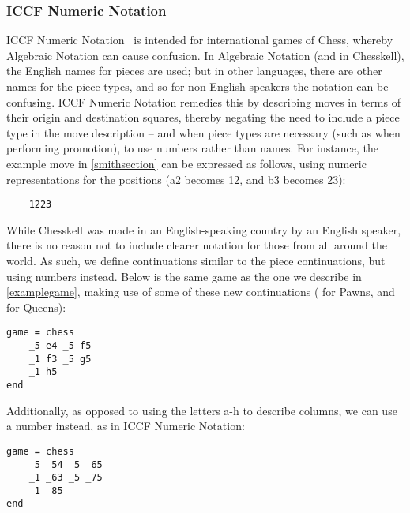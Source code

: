 \subsubsection{ICCF Numeric Notation} \label{numberextension}

ICCF Numeric Notation~\cite{iccfnotation} is intended for international games of Chess, whereby Algebraic Notation can cause confusion. In Algebraic Notation (and in Chesskell), the English names for pieces are used; but in other languages, there are other names for the piece types, and so for non-English speakers the notation can be confusing. ICCF Numeric Notation remedies this by describing moves in terms of their origin and destination squares, thereby negating the need to include a piece type in the move description -- and when piece types are necessary (such as when performing promotion), to use numbers rather than names. For instance, the example move in \cref{smithsection} can be expressed as follows, using numeric representations for the positions (a2 becomes 12, and b3 becomes 23):

\begin{verbatim}
    1223
\end{verbatim}

While Chesskell was made in an English-speaking country by an English speaker, there is no reason not to include clearer notation for those from all around the world. As such, we define continuations similar to the piece continuations, but using numbers instead. Below is the same game as the one we describe in \cref{examplegame}, making use of some of these new continuations ( for Pawns, and  for Queens):

\begin{lstlisting}
game = chess
    _5 e4 _5 f5
    _1 f3 _5 g5
    _1 h5
end
\end{lstlisting}

Additionally, as opposed to using the letters a-h to describe columns, we can use a number instead, as in ICCF Numeric Notation:

\begin{lstlisting}
game = chess
    _5 _54 _5 _65
    _1 _63 _5 _75
    _1 _85
end
\end{lstlisting}